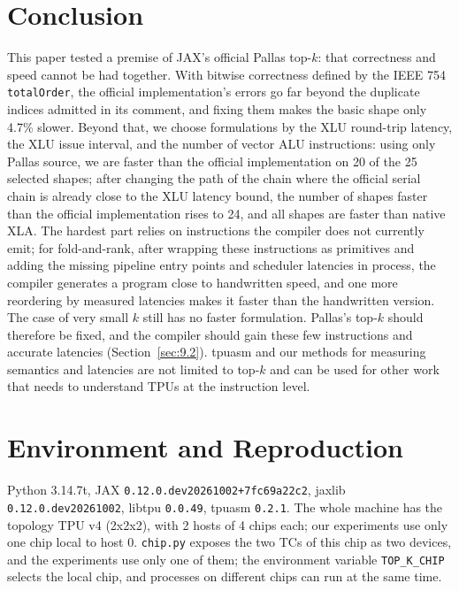 \documentclass[sigconf,nonacm,balance=false]{acmart}
\newcommand{\code}[1]{\texttt{#1}}
\begin{document}
\section{Conclusion}
\label{sec:11}

This paper tested a premise of JAX's official Pallas top-$k$: that correctness and speed cannot be had together. With bitwise correctness defined by the IEEE 754 \code{total\allowbreak{}Order}, the official implementation's errors go far beyond the duplicate indices admitted in its comment, and fixing them makes the basic shape only 4.7\% slower. Beyond that, we choose formulations by the XLU round-trip latency, the XLU issue interval, and the number of vector ALU instructions: using only Pallas source, we are faster than the official implementation on 20 of the 25 selected shapes; after changing the path of the chain where the official serial chain is already close to the XLU latency bound, the number of shapes faster than the official implementation rises to 24, and all shapes are faster than native XLA. The hardest part relies on instructions the compiler does not currently emit; for fold-and-rank, after wrapping these instructions as primitives and adding the missing pipeline entry points and scheduler latencies in process, the compiler generates a program close to handwritten speed, and one more reordering by measured latencies makes it faster than the handwritten version. The case of very small $k$ still has no faster formulation. Pallas's top-$k$ should therefore be fixed, and the compiler should gain these few instructions and accurate latencies (Section~\ref{sec:9.2}). tpuasm and our methods for measuring semantics and latencies are not limited to top-$k$ and can be used for other work that needs to understand TPUs at the instruction level.




\appendix

\section{Environment and Reproduction}
\label{sec:A}

Python 3.14.7t, JAX \code{0.\allowbreak{}12.\allowbreak{}0.\allowbreak{}dev20261002+7fc69a22c2}, jaxlib \code{0.\allowbreak{}12.\allowbreak{}0.\allowbreak{}dev20261002}, libtpu \code{0.\allowbreak{}0.\allowbreak{}49}, tpuasm \code{0.\allowbreak{}2.\allowbreak{}1}. The whole machine has the topology TPU v4 (2x2x2), with 2 hosts of 4 chips each; our experiments use only one chip local to host 0. \code{chip.\allowbreak{}py} exposes the two TCs of this chip as two devices, and the experiments use only one of them; the environment variable \code{TOP\_\allowbreak{}K\_\allowbreak{}CHIP} selects the local chip, and processes on different chips can run at the same time.
\end{document}
